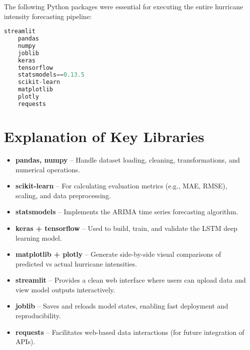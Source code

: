 The following Python packages were essential for executing the entire hurricane intensity forecasting pipeline:

\begin{lstlisting}[language=Python, caption={requirements.txt}]
	streamlit
	pandas
	numpy
	joblib
	keras
	tensorflow
	statsmodels==0.13.5
	scikit-learn
	matplotlib
	plotly
	requests
\end{lstlisting}

\section{Explanation of Key Libraries}

\begin{itemize}
	\item \textbf{pandas, numpy} – Handle dataset loading, cleaning, transformations, and numerical operations.
	\item \textbf{scikit-learn} – For calculating evaluation metrics (e.g., MAE, RMSE), scaling, and data preprocessing.
	\item \textbf{statsmodels} – Implements the ARIMA time series forecasting algorithm.
	\item \textbf{keras + tensorflow} – Used to build, train, and validate the LSTM deep learning model.
	\item \textbf{matplotlib + plotly} – Generate side-by-side visual comparisons of predicted vs actual hurricane intensities.
	\item \textbf{streamlit} – Provides a clean web interface where users can upload data and view model outputs interactively.
	\item \textbf{joblib} – Saves and reloads model states, enabling fast deployment and reproducibility.
	\item \textbf{requests} – Facilitates web-based data interactions (for future integration of APIs).
\end{itemize}

